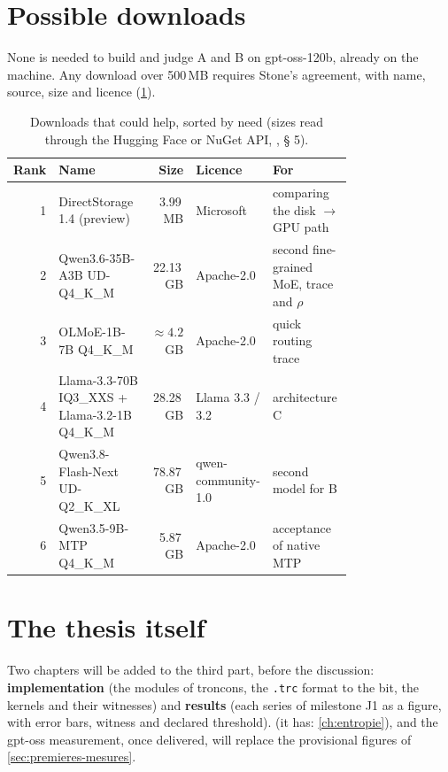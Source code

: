 \section{Possible downloads}\label{sec:telechargements-futurs}

None is needed to build and judge A and B on gpt-oss-120b, already on the machine. Any download over 500\,MB requires Stone's agreement, with name, source, size and licence (\cref{tab:telechargements-futurs}).

\begin{table}[ht]
\centering\small
\caption[Downloads that could help]{Downloads that could help, sorted by need \litt{} (sizes read through the Hugging Face or NuGet API, , § 5).}
\label{tab:telechargements-futurs}
\begin{tabular}{@{}rp{0.34\linewidth}rp{0.15\linewidth}p{0.27\linewidth}@{}}
\toprule
Rank & Name & Size & Licence & For \\
\midrule
1 & DirectStorage 1.4 (preview) & 3.99\,MB & Microsoft & comparing the disk $\to$ GPU path \\
2 & Qwen3.6-35B-A3B UD-Q4\_K\_M & 22.13\,GB & Apache-2.0 & second fine-grained MoE, trace and $\rho$ \\
3 & OLMoE-1B-7B Q4\_K\_M & $\approx 4.2$\,GB & Apache-2.0 & quick routing trace \\
4 & Llama-3.3-70B IQ3\_XXS + Llama-3.2-1B Q4\_K\_M & 28.28\,GB & Llama 3.3 / 3.2 & architecture C \\
5 & Qwen3.8-Flash-Next UD-Q2\_K\_XL & 78.87\,GB & qwen-community-1.0 & second model for B \\
6 & Qwen3.5-9B-MTP Q4\_K\_M & 5.87\,GB & Apache-2.0 & acceptance of native MTP \\
\bottomrule
\end{tabular}
\end{table}

\section{The thesis itself}\label{sec:memoire-suite}

Two chapters will be added to the third part, before the discussion: \textbf{implementation} (the modules of troncons, the \texttt{.trc} format to the bit, the kernels and their witnesses) and \textbf{results} (each series of milestone J1 as a figure, with error bars, witness and declared threshold).  (it has: \cref{ch:entropie}), and the gpt-oss measurement, once delivered, will replace the provisional figures of \cref{sec:premieres-mesures}.

